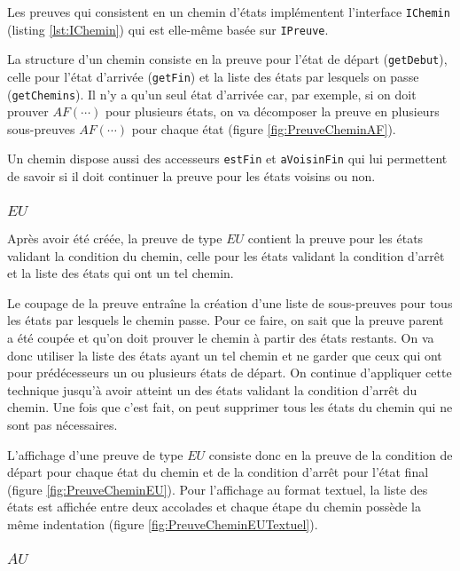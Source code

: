 \documentclass[dvipsnames]{report}
\begin{document}
Les preuves qui consistent en un chemin d'états implémentent l'interface \texttt{IChemin} (listing \ref{lst:IChemin}) qui est elle-même basée sur \texttt{IPreuve}.

La structure d'un chemin consiste en la preuve pour l'état de départ (\texttt{getDebut}), celle pour l'état d'arrivée (\texttt{getFin}) et la liste des états par lesquels on passe (\texttt{getChemins}). Il n'y a qu'un seul état d'arrivée car, par exemple, si on doit prouver $AF(\cdots)$ pour plusieurs états, on va décomposer la preuve en plusieurs sous-preuves $AF(\cdots)$ pour chaque état (figure \ref{fig:PreuveCheminAF}).



Un chemin dispose aussi des accesseurs \texttt{estFin} et \texttt{aVoisinFin} qui lui permettent de savoir si il doit continuer la preuve pour les états voisins ou non.

\subsubsection{$EU$}

Après avoir été créée, la preuve de type $EU$ contient la preuve pour les états validant la condition du chemin, celle pour les états validant la condition d'arrêt et la liste des états qui ont un tel chemin.

Le coupage de la preuve entraîne la création d'une liste de sous-preuves pour tous les états par lesquels le chemin passe. Pour ce faire, on sait que la preuve parent a été coupée et qu'on doit prouver le chemin à partir des états restants. On va donc utiliser la liste des états ayant un tel chemin et ne garder que ceux qui ont pour prédécesseurs un ou plusieurs états de départ. On continue d'appliquer cette technique jusqu'à avoir atteint un des états validant la condition d'arrêt du chemin. Une fois que c'est fait, on peut supprimer tous les états du chemin qui ne sont pas nécessaires.

L'affichage d'une preuve de type $EU$ consiste donc en la preuve de la condition de départ pour chaque état du chemin et de la condition d'arrêt pour l'état final (figure \ref{fig:PreuveCheminEU}). Pour l'affichage au format textuel, la liste des états est affichée entre deux accolades et chaque étape du chemin possède la même indentation (figure \ref{fig:PreuveCheminEUTextuel}).



\subsubsection{$AU$}
\end{document}
